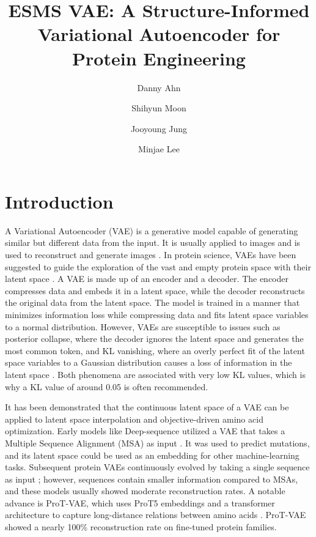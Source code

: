 \documentclass[numsec,webpdf,contemporary,medium]{oup-authoring-template}
\title[ESMS VAE: Structure-Informed VAE for Protein Engineering]{ESMS VAE: A Structure-Informed Variational Autoencoder for Protein Engineering}
\author[1,$\ast$]{Danny Ahn\orcidlink{0009-0006-2820-1498}}
\author[1]{Shihyun Moon\orcidlink{0000-0000-0000-0000}}
\author[1]{Jooyoung Jung\orcidlink{0000-0000-0000-0002}}
\author[1]{Minjae Lee\orcidlink{0009-0002-7484-7338}}
\begin{document}
\maketitle
\section{Introduction}\label{sec:introduction}
A Variational Autoencoder (VAE) \citep{kingma2022autoencodingvariationalbayes} is a generative model capable of generating similar but different data from the input. It is usually applied to images and is used to reconstruct and generate images \citep{greener2018protein}. In protein science, VAEs have been suggested to guide the exploration of the vast and empty protein space with their latent space \citep{greener2018protein}. A VAE is made up of an encoder and a decoder. The encoder compresses data and embeds it in a latent space, while the decoder reconstructs the original data from the latent space. The model is trained in a manner that minimizes information loss while compressing data and fits latent space variables to a normal distribution. However, VAEs are susceptible to issues such as posterior collapse, where the decoder ignores the latent space and generates the most common token, and KL vanishing, where an overly perfect fit of the latent space variables to a Gaussian distribution causes a loss of information in the latent space \citep{lucas2019understanding}. Both phenomena are associated with very low KL values, which is why a KL value of around 0.05 is often recommended.

It has been demonstrated that the continuous latent space of a VAE can be applied to latent space interpolation and objective-driven amino acid optimization. Early models like Deep-sequence utilized a VAE that takes a Multiple Sequence Alignment (MSA) as input \citep{riesselman2018deepsequence}. It was used to predict mutations, and its latent space could be used as an embedding for other machine-learning tasks. Subsequent protein VAEs continuously evolved by taking a single sequence as input \citep{sinai2017lc}; however, sequences contain smaller information compared to MSAs, and these models usually showed moderate reconstruction rates. A notable advance is ProT-VAE, which uses ProT5 embeddings and a transformer architecture to capture long-distance relations between amino acids \citep{elnaggar2021prottrans}. ProT-VAE showed a nearly 100\% reconstruction rate on fine-tuned protein families.
\end{document}
